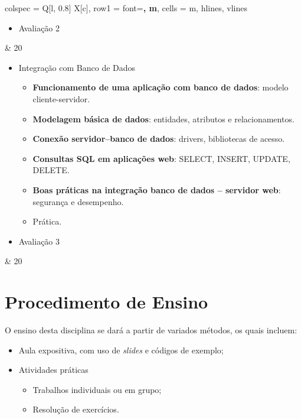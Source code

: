 \documentclass[a4paper, 12pt]{article}
\begin{document}
\begin{longtblr}{colspec = {Q[l, 0.8\textwidth] X[c]},
        row{1} = {font=\bfseries, m},
        cells = {m},
        hlines, vlines
        }
\begin{itemize}
\begin{itemize}
                \item \textbf{Introdução a frameworks de desenvolvimento}: o papel dos frameworks, vantagens.
                \item \textbf{Ferramentas de apoio ao desenvolvimento}: IDEs, sistemas de versionamento, bibliotecas auxiliares.
                \item Prática.
            \end{itemize}
        \item Avaliação 2
    \end{itemize} & 20\\
    \begin{itemize}
        \item Integração com Banco de Dados
            \begin{itemize}
                \item \textbf{Funcionamento de uma aplicação com banco de dados}: modelo cliente-servidor.
                \item \textbf{Modelagem básica de dados}: entidades, atributos e relacionamentos.
                \item \textbf{Conexão servidor–banco de dados}: drivers, bibliotecas de acesso.
                \item \textbf{Consultas SQL em aplicações web}: SELECT, INSERT, UPDATE, DELETE.
                \item \textbf{Boas práticas na integração banco de dados – servidor web}: segurança e desempenho.
                \item Prática.
            \end{itemize}
        \item Avaliação 3
    \end{itemize} & 20\\
\end{longtblr}

\section{Procedimento de Ensino}

O ensino desta disciplina se dará a partir de variados métodos, os quais incluem: 
\begin{itemize}
    \item Aula expositiva, com uso de \textit{slides} e códigos de exemplo;
    \item Atividades práticas
        \begin{itemize}
            \item Trabalhos individuais ou em grupo;
            \item Resolução de exercícios.
        \end{itemize}
\end{itemize}
\end{document}
